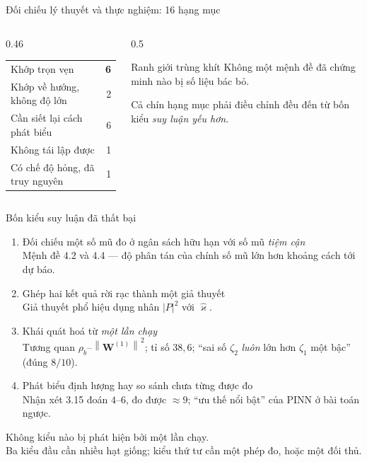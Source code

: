 \documentclass[aspectratio=169,11pt]{beamer}
\newcommand{\bW}{\bm{W}}
\newcommand{\norm}[1]{\left\lVert #1 \right\rVert}
\newcommand{\abs}[1]{\left\lvert #1 \right\rvert}
\newcommand{\good}[1]{\textcolor{good}{\textbf{#1}}}
\begin{document}
\begin{frame}{Đối chiếu lý thuyết và thực nghiệm: 16 hạng mục}
\begin{columns}[T]
\begin{column}{0.46\textwidth}
\small
\begin{tabular}{@{}lr@{}}
\toprule
Khớp trọn vẹn & \good{6} \\
Khớp về hướng, không độ lớn & 2 \\
Cần siết lại cách phát biểu & 6 \\
Không tái lập được & 1 \\
Có chế độ hỏng, đã truy nguyên & 1 \\
\bottomrule
\end{tabular}
\end{column}
\begin{column}{0.5\textwidth}
\begin{alertblock}{Ranh giới trùng khít}
\alert{Không một mệnh đề đã chứng minh nào bị số liệu bác bỏ.}

\smallskip
Cả chín hạng mục phải điều chỉnh đều đến từ bốn kiểu \emph{suy luận yếu hơn}.
\end{alertblock}
\end{column}
\end{columns}
\end{frame}

\begin{frame}{Bốn kiểu suy luận đã thất bại}
\begin{enumerate}
\item Đối chiếu một số mũ đo ở ngân sách hữu hạn với số mũ \emph{tiệm cận}
  \\{\footnotesize Mệnh đề 4.2 và 4.4 --- độ phân tán của chính số mũ lớn hơn
  khoảng cách tới dự báo.}
\item Ghép hai kết quả rời rạc thành một giả thuyết
  \\{\footnotesize Giả thuyết phổ hiệu dụng nhân $\abs{P}^2$ với $\widehat{\varkappa}$.}
\item Khái quát hoá từ \emph{một lần chạy}
  \\{\footnotesize Tương quan $\rho_b$--$\norm{\bW^{(1)}}^2$; tỉ số $38{,}6$;
  ``sai số $\zeta_2$ \emph{luôn} lớn hơn $\zeta_1$ một bậc'' (đúng $8/10$).}
\item Phát biểu định lượng hay so sánh chưa từng được đo
  \\{\footnotesize Nhận xét 3.15 đoán $4$--$6$, đo được $\approx 9$; ``ưu thế nổi
  bật'' của PINN ở bài toán ngược.}
\end{enumerate}

\medskip
\centering
\alert{Không kiểu nào bị phát hiện bởi một lần chạy.}\\
Ba kiểu đầu cần nhiều hạt giống; kiểu thứ tư cần một phép đo, hoặc một đối thủ.
\end{frame}
\end{document}
